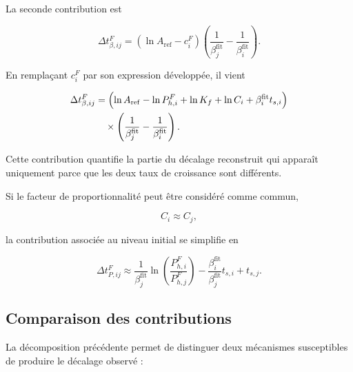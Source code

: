 \documentclass[
    11pt,
    a4paper
]{article}
\begin{document}
La seconde contribution est

\begin{equation}
    \Delta t_{\beta,ij}^{F}
    =
    \left(
        \ln A_{\mathrm{ref}}-c_i^{F}
    \right)
    \left(
        \frac{1}{\beta_j^{\mathrm{fit}}}
        -
        \frac{1}{\beta_i^{\mathrm{fit}}}
    \right).
    \label{eq:contribution-beta-force-ciF}
\end{equation}

En remplaçant \(c_i^{F}\) par son expression développée, il vient

\begin{align}
    \Delta t_{\beta,ij}^{F}
    &=
    \Bigl(
        \ln A_{\mathrm{ref}}
        -
        \ln P_{h,i}^{F}
        +
        \ln K_f
        +
        \ln C_i
        +
        \beta_i^{\mathrm{fit}}t_{s,i}
    \Bigr)
    \nonumber\\
    &\quad\times
    \left(
        \frac{1}{\beta_j^{\mathrm{fit}}}
        -
        \frac{1}{\beta_i^{\mathrm{fit}}}
    \right).
    \label{eq:contribution-beta-force}
\end{align}

Cette contribution quantifie la partie du décalage reconstruit qui apparaît
uniquement parce que les deux taux de croissance sont différents.

Si le facteur de proportionnalité peut être considéré comme commun,

\begin{equation}
    C_i\approx C_j,
\end{equation}

la contribution associée au niveau initial se simplifie en

\begin{equation}
    \Delta t_{P,ij}^{F}
    \approx
    \frac{1}{\beta_j^{\mathrm{fit}}}
    \ln\left(
        \frac{P_{h,i}^{F}}
        {P_{h,j}^{F}}
    \right)
    -
    \frac{\beta_i^{\mathrm{fit}}}
    {\beta_j^{\mathrm{fit}}}
    t_{s,i}
    +
    t_{s,j}.
    \label{eq:contribution-P-force-simplifiee}
\end{equation}

\subsection{Comparaison des contributions}
\label{subsec:comparaison-contributions-beta-differents}

La décomposition précédente permet de distinguer deux mécanismes susceptibles
de produire le décalage observé :
\end{document}
